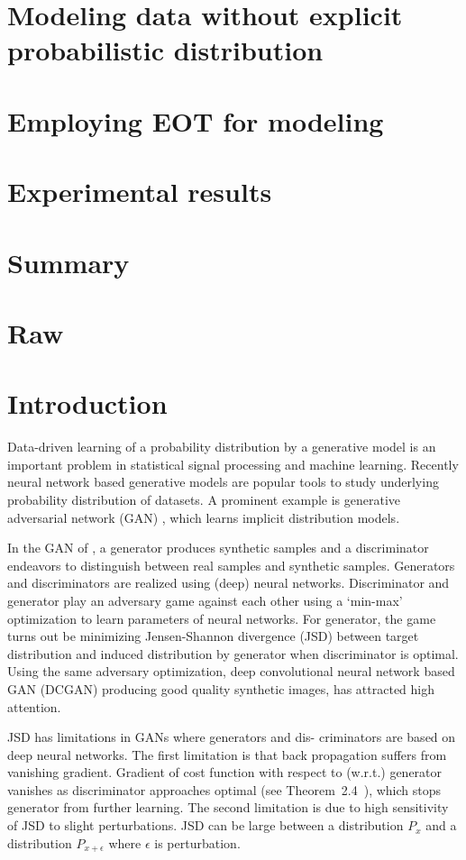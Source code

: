 \section{Modeling data without explicit probabilistic distribution}

\section{Employing EOT for modeling}

\section{Experimental results}

\section{Summary}
\section{Raw}
\section{Introduction}

Data-driven learning of a probability distribution by a generative model is an important problem 
in statistical signal processing and machine learning. 
Recently neural network based generative models are popular tools to
study underlying probability distribution of datasets. A prominent example is 
generative adversarial network (GAN) \cite{NIPS2014_5423}, which learns 
implicit distribution models. 

In the GAN of \cite{NIPS2014_5423}, a generator produces
synthetic samples and a discriminator endeavors to
distinguish between real samples and synthetic samples. Generators and discriminators are realized using (deep) neural networks.
Discriminator and generator
play an adversary game against each other using a `min-max' optimization to learn parameters of neural networks. 
For generator, the game
turns out be minimizing Jensen-Shannon divergence (JSD) between
target distribution and induced distribution by generator when discriminator is
optimal. Using the same adversary
optimization, deep convolutional neural network based GAN (DCGAN)
\cite{2015arXiv151106434R} producing good quality synthetic images, has attracted high attention.

JSD has limitations in GANs where generators and dis-
criminators are based on deep neural networks. The first limitation is that back
propagation suffers from vanishing gradient. Gradient of cost
function with respect to (w.r.t.) generator vanishes as
discriminator approaches optimal (see Theorem~2.4~\cite{2017arXiv170104862A}),
which stops generator from further learning. The second limitation is due to high sensitivity of JSD to slight perturbations. JSD can be large between a distribution $P_x$ and a distribution $P_{x+\epsilon}$ where $\epsilon$ is perturbation\cite{2017arXiv170104862A}. 

